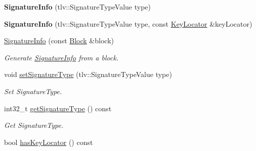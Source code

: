 \begin{DoxyCompactItemize}
\item 
{\bfseries Signature\+Info} (tlv\+::\+Signature\+Type\+Value type)\hypertarget{classndn_1_1SignatureInfo_a2fdf17543dd8accbef71738387438882}{}\label{classndn_1_1SignatureInfo_a2fdf17543dd8accbef71738387438882}

\item 
{\bfseries Signature\+Info} (tlv\+::\+Signature\+Type\+Value type, const \hyperlink{classndn_1_1KeyLocator}{Key\+Locator} \&key\+Locator)\hypertarget{classndn_1_1SignatureInfo_adaf9272e2bc5506ff89b16648095ae54}{}\label{classndn_1_1SignatureInfo_adaf9272e2bc5506ff89b16648095ae54}

\item 
\hyperlink{classndn_1_1SignatureInfo_a2827a45d381108889193d071dc1e74a2}{Signature\+Info} (const \hyperlink{classndn_1_1Block}{Block} \&block)
\begin{DoxyCompactList}\small\item\em Generate \hyperlink{classndn_1_1SignatureInfo}{Signature\+Info} from a block. \end{DoxyCompactList}\item 
void \hyperlink{classndn_1_1SignatureInfo_ac9e208feec58eadbc8d51c8e391f87ab}{set\+Signature\+Type} (tlv\+::\+Signature\+Type\+Value type)\hypertarget{classndn_1_1SignatureInfo_ac9e208feec58eadbc8d51c8e391f87ab}{}\label{classndn_1_1SignatureInfo_ac9e208feec58eadbc8d51c8e391f87ab}

\begin{DoxyCompactList}\small\item\em Set Signature\+Type. \end{DoxyCompactList}\item 
int32\+\_\+t \hyperlink{classndn_1_1SignatureInfo_a92195263ffccbe0f4fe882226b98531c}{get\+Signature\+Type} () const\hypertarget{classndn_1_1SignatureInfo_a92195263ffccbe0f4fe882226b98531c}{}\label{classndn_1_1SignatureInfo_a92195263ffccbe0f4fe882226b98531c}

\begin{DoxyCompactList}\small\item\em Get Signature\+Type. \end{DoxyCompactList}\item 
bool \hyperlink{classndn_1_1SignatureInfo_aa91ca6dfa32d96c0d779bfceeb62645e}{has\+Key\+Locator} () const\hypertarget{classndn_1_1SignatureInfo_aa91ca6dfa32d96c0d779bfceeb62645e}{}\label{classndn_1_1SignatureInfo_aa91ca6dfa32d96c0d779bfceeb62645e}


\end{DoxyCompactItemize}
